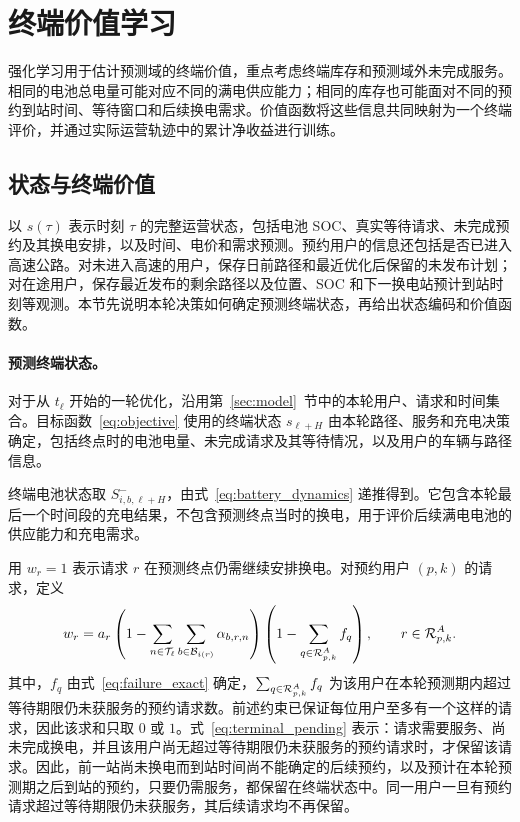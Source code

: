 \section{终端价值学习}
\label{sec:value}

强化学习用于估计预测域的终端价值，重点考虑终端库存和预测域外未完成服务。相同的电池总电量可能对应不同的满电供应能力；相同的库存也可能面对不同的预约到站时间、等待窗口和后续换电需求。价值函数将这些信息共同映射为一个终端评价，并通过实际运营轨迹中的累计净收益进行训练。

\subsection{状态与终端价值}
\label{sec:value_state}

以 $s(\tau)$ 表示时刻 $\tau$ 的完整运营状态，包括电池 SOC、真实等待请求、未完成预约及其换电安排，以及时间、电价和需求预测。预约用户的信息还包括是否已进入高速公路。对未进入高速的用户，保存日前路径和最近优化后保留的未发布计划；对在途用户，保存最近发布的剩余路径以及位置、SOC 和下一换电站预计到站时刻等观测。本节先说明本轮决策如何确定预测终端状态，再给出状态编码和价值函数。

\paragraph{预测终端状态。}
对于从 $t_\ell$ 开始的一轮优化，沿用第~\ref{sec:model}~节中的本轮用户、请求和时间集合。目标函数~\eqref{eq:objective} 使用的终端状态 $s_{\ell+H}$ 由本轮路径、服务和充电决策确定，包括终点时的电池电量、未完成请求及其等待情况，以及用户的车辆与路径信息。

终端电池状态取 $S_{i,b,\ell+H}^{-}$，由式~\eqref{eq:battery_dynamics} 递推得到。它包含本轮最后一个时间段的充电结果，不包含预测终点当时的换电，用于评价后续满电电池的供应能力和充电需求。

用 $w_r=1$ 表示请求 $r$ 在预测终点仍需继续安排换电。对预约用户 $(p,k)$ 的请求，定义
\begin{equation}
w_r=a_r\left(
1-\sum_{n\in\mathcal T_\ell}
\sum_{b\in\mathcal B_{i(r)}}\alpha_{b,r,n}
\right)\left(1-\sum_{q\in\mathcal R_{p,k}^A}f_q\right),\qquad r\in\mathcal R_{p,k}^A.
\label{eq:terminal_pending}
\end{equation}
其中，$f_q$ 由式~\eqref{eq:failure_exact} 确定，$\sum_{q\in\mathcal R_{p,k}^A}f_q$ 为该用户在本轮预测期内超过等待期限仍未获服务的预约请求数。前述约束已保证每位用户至多有一个这样的请求，因此该求和只取 $0$ 或 $1$。式~\eqref{eq:terminal_pending} 表示：请求需要服务、尚未完成换电，并且该用户尚无超过等待期限仍未获服务的预约请求时，才保留该请求。因此，前一站尚未换电而到站时间尚不能确定的后续预约，以及预计在本轮预测期之后到站的预约，只要仍需服务，都保留在终端状态中。同一用户一旦有预约请求超过等待期限仍未获服务，其后续请求均不再保留。

